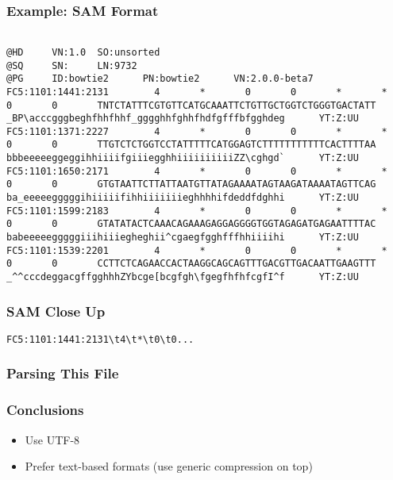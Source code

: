 \begin{frame}[fragile]
\frametitle{Example: SAM Format}
\begin{verbatim}

@HD     VN:1.0  SO:unsorted
@SQ     SN:     LN:9732
@PG     ID:bowtie2      PN:bowtie2      VN:2.0.0-beta7
FC5:1101:1441:2131        4       *       0       0       *       *       0       0       TNTCTATTTCGTGTTCATGCAAATTCTGTTGCTGGTCTGGGTGACTATT       _BP\acccgggbeghfhhfhhf_gggghhfghhfhdfgfffbfgghdeg      YT:Z:UU
FC5:1101:1371:2227        4       *       0       0       *       *       0       0       TTGTCTCTGGTCCTATTTTTCATGGAGTCTTTTTTTTTTTCACTTTTAA       bbbeeeeeggeggihhiiiifgiiiegghhiiiiiiiiiiZZ\cghgd`      YT:Z:UU
FC5:1101:1650:2171        4       *       0       0       *       *       0       0       GTGTAATTCTTATTAATGTTATAGAAAATAGTAAGATAAAATAGTTCAG       ba_eeeeegggggihiiiiifihhiiiiiiieghhhhifdeddfdghhi      YT:Z:UU
FC5:1101:1599:2183        4       *       0       0       *       *       0       0       GTATATACTCAAACAGAAAGAGGAGGGGTGGTAGAGATGAGAATTTTAC       babeeeeegggggiiihiiiegheghii^cgaegfgghfffhhiiiihi      YT:Z:UU
FC5:1101:1539:2201        4       *       0       0       *       *       0       0       CCTTCTCAGAACCACTAAGGCAGCAGTTTGACGTTGACAATTGAAGTTT       _^^cccdeggacgffgghhhZYbcge[bcgfgh\fgegfhfhfcgfI^f      YT:Z:UU
\end{verbatim}
\end{frame}

\begin{frame}[fragile]
\frametitle{SAM Close Up}

\begin{verbatim}
FC5:1101:1441:2131\t4\t*\t0\t0...
\end{verbatim}

\end{frame}

\begin{frame}[fragile]
\frametitle{Parsing This File}

\end{frame}

\begin{frame}[fragile]
\frametitle{Conclusions}
\begin{itemize}
\item Use UTF-8
\item Prefer text-based formats (use generic compression on top)
\end{itemize}
\end{frame}


